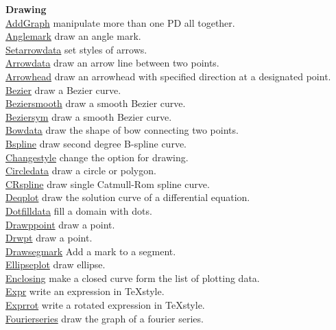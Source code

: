 \documentclass[papersize,a4paper,12pt]{article}
\begin{document}
\begin{tabbing}
{\bf Drawing} \> \\
\hyperlink{addgraph}{AddGraph} \> manipulate more than one PD all together.\\
\hyperlink{anglemark}{Anglemark} \> draw an angle mark.\\
\hyperlink{setarrow}{Setarrowdata}  \> set styles of arrows.\\
\hyperlink{arrowdata}{Arrowdata}  \> draw an arrow line between two points.\\
\hyperlink{arrowhead}{Arrowhead}  \>draw an arrowhead with specified direction at a designated point.\\
\hyperlink{bezier}{Bezier} \> draw a  Bezier curve.\\
\hyperlink{beziersmooth}{Beziersmooth} \> draw a smooth Bezier curve.\\\hyperlink{beziersym}{Beziersym}  \> draw a smooth Bezier curve.\\
\hyperlink{bowdata}{Bowdata} \> draw the shape of bow connecting two points.\\
\hyperlink{bspline}{Bspline} \> draw second degree B-spline curve. \\
\hyperlink{changestyle}{Changestyle} \> change the option for drawing. \\
\hyperlink{circledata}{Circledata} \> draw a circle or polygon. \\
\hyperlink{crspline}{CRspline} \> draw single Catmull-Rom spline curve. \\
\hyperlink{deqplot}{Deqplot} \> draw the solution curve of a differential equation.\\
\hyperlink{dotfilldata}{Dotfilldata} \> fill a domain with dots.\\
\hyperlink{drwpt}{Drawppoint} \> draw a point. \\
\hyperlink{drwpt}{Drwpt} \> draw a point. \\
\hyperlink{drawsegmark}{Drawsegmark} \> Add a mark to a segment. \\
\hyperlink{ellipseplot}{Ellipseplot} \> draw ellipse.\\
\hyperlink{enclosing}{Enclosing} \> make a closed curve form the list of plotting data.\\
\hyperlink{expr}{Expr} \> write an expression in \TeX style.\\
\hyperlink{exprrot}{Exprrot} \> write a rotated expression in \TeX style.\\
\hyperlink{fourierseries}{Fourierseries} \> draw the graph of a fourier series.\\

\end{tabbing}
\end{document}

